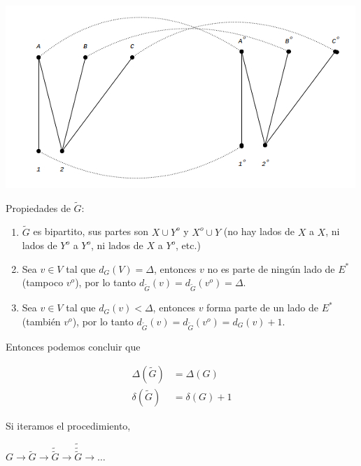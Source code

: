 \documentclass[10pt,a4paper]{article}
\begin{document}
\begin{center}

    \begin{adjustbox}{max size={\textwidth}{\textheight}}
        \includegraphics{definitions/matching_15.jpg}
        \end{adjustbox}
    
\end{center}

Propiedades de $\tilde G$:

\begin{enumerate}

	\item $\tilde G$ es bipartito, sus partes son $X \cup Y^o$ y $X^o \cup Y$ (no hay lados de $X$ a $X$, ni lados de $Y^o$ a $Y^o$, ni lados de $X$ a $Y^o$, etc.)
	\item Sea $v\in V$ tal que $d_G(V) = \Delta$, entonces $v$ no es parte de ningún lado de $E^*$ (tampoco $v^o$), por lo tanto $d_{\tilde G}(v) = d_{\tilde G}(v^o) = \Delta$.
	\item Sea $v \in V$ tal que $d_G(v) < \Delta$, entonces $v$ forma parte de un lado de $E^*$ (también $v^o$), por lo tanto $d_{\tilde G}(v) = d_{\tilde G}(v^o) = d_G(v) + 1$.
\end{enumerate}

Entonces podemos concluir que

\begin{center}
\begin{align*} \Delta(\tilde G) &= \Delta(G)\\ \delta(\tilde G) &= \delta(G) + 1 \end{align*}
\end{center}

Si iteramos el procedimiento,

\begin{center}
$G \rightarrow \tilde G \rightarrow \tilde{\tilde G} \rightarrow \tilde{\tilde{\tilde G}} \rightarrow \dots$
\end{center}
\end{document}
